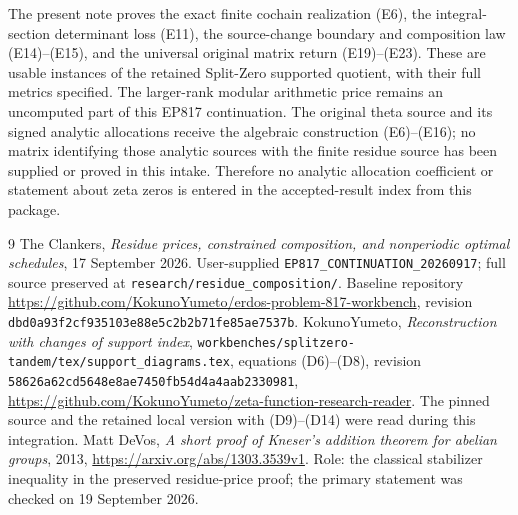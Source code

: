 \documentclass[11pt]{article}
\begin{document}
The present note proves the exact finite cochain realization (E6),
the integral-section determinant loss (E11), the source-change
boundary and composition law (E14)--(E15), and the universal original
matrix return (E19)--(E23).  These are usable instances of the retained
Split-Zero supported quotient, with their full metrics specified.
The larger-rank modular arithmetic price remains an uncomputed part
of this EP817 continuation.  The original theta source and its signed
analytic allocations receive the algebraic construction (E6)--(E16);
no matrix identifying those analytic sources with the finite residue
source has been supplied or proved in this intake.  Therefore no
analytic allocation coefficient or statement about zeta zeros is
entered in the accepted-result index from this package.

\begin{thebibliography}{9}
The Clankers, \emph{Residue prices, constrained composition, and nonperiodic
optimal schedules}, 17 September 2026.  User-supplied
\texttt{EP817\_CONTINUATION\_20260917}; full source preserved at
\texttt{research/residue\_composition/}.
Baseline repository
\url{https://github.com/KokunoYumeto/erdos-problem-817-workbench},
revision \texttt{dbd0a93f2cf935103e88e5c2b2b71fe85ae7537b}.
KokunoYumeto, \emph{Reconstruction with changes of support index},
\texttt{workbenches/splitzero-tandem/tex/support\_diagrams.tex},
equations (D6)--(D8), revision
\texttt{58626a62cd5648e8ae7450fb54d4a4aab2330981},
\url{https://github.com/KokunoYumeto/zeta-function-research-reader}.
The pinned source and the retained local version with (D9)--(D14) were
read during this integration.
Matt DeVos, \emph{A short proof of Kneser's addition theorem for abelian
groups}, 2013, \url{https://arxiv.org/abs/1303.3539v1}.
Role: the classical stabilizer inequality in the preserved residue-price
proof; the primary statement was checked on 19 September 2026.
\end{thebibliography}
\end{document}
